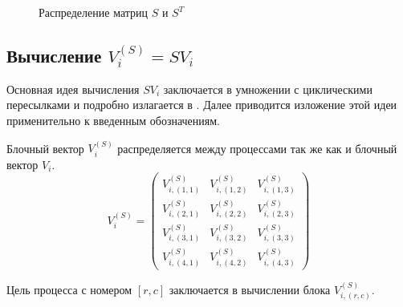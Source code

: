 \begin{figure}
	\caption{Распределение матриц $S$ и $S^T$}
	\label{figure:csmi:S_distribution}
\end{figure}

\subsection{Вычисление $V_i^{(S)} = S V_i$}

Основная идея вычисления $S V_i$ заключается в умножении с циклическими пересылками и подробно излагается в \cite{Zamarashkin}. Далее приводится изложение этой идеи
применительно к введенным обозначениям.

Блочный вектор $V_i^{(S)}$ распределяется между процессами так же как и блочный вектор $V_i$.
$$
	V_i^{(S)}
	=
	\begin{pmatrix}
		V_{i,(1,1)}^{(S)} & V_{i,(1,2)}^{(S)} & V_{i,(1,3)}^{(S)} \\
		V_{i,(2,1)}^{(S)} & V_{i,(2,2)}^{(S)} & V_{i,(2,3)}^{(S)} \\
		V_{i,(3,1)}^{(S)} & V_{i,(3,2)}^{(S)} & V_{i,(3,3)}^{(S)} \\
		V_{i,(4,1)}^{(S)} & V_{i,(4,2)}^{(S)} & V_{i,(4,3)}^{(S)}
	\end{pmatrix}
$$

Цель процесса с номером $[r,c]$ заключается в вычислении блока $V_{i,(r,c)}^{(S)}$.

